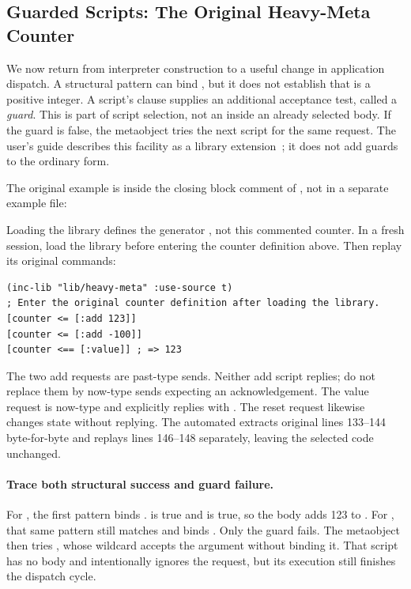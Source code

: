 \subsection{Guarded Scripts: The Original Heavy-Meta Counter}
\label{sec:guards}

We now return from interpreter construction to a useful change in
application dispatch. A structural pattern can bind , but it does not establish that
 is a positive integer. A script's  clause supplies
an additional acceptance test, called a \emph{guard}. This is part of
script selection, not an  inside an already selected body.
If the guard is false, the metaobject tries the next script for the
same request. The user's guide describes this facility as a library
extension~\cite{guide}; it does not add guards to the ordinary
 form.

The original example is inside the closing block comment of
, not in a separate example file:


Loading the library defines the generator , not this
commented counter. In a fresh session, load the library before entering
the counter definition above. Then replay its original commands:

\begin{codeblock}
\begin{lstlisting}
(inc-lib "lib/heavy-meta" :use-source t)
; Enter the original counter definition after loading the library.
[counter <= [:add 123]]
[counter <= [:add -100]]
[counter <== [:value]] ; => 123
\end{lstlisting}
\end{codeblock}

The two add requests are past-type sends. Neither add script replies;
do not replace them by now-type sends expecting an acknowledgement.
The value request is now-type and explicitly replies with .
The reset request likewise changes state without replying.
The automated  extracts original lines 133--144
byte-for-byte and replays lines 146--148 separately, leaving the
selected code unchanged.

\paragraph{Trace both structural success and guard failure.}
For \code{[:add 123]}, the first pattern binds .
 is true and  is true, so the body adds 123
to . For \code{[:add -100]}, that same pattern still matches
and binds . Only the guard fails. The metaobject then
tries \code{[:add \_]}, whose wildcard accepts the argument without
binding it. That script has no body and intentionally ignores the
request, but its execution still finishes the dispatch cycle.

